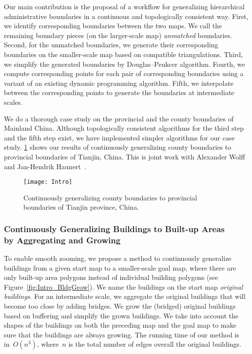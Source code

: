 Our main contribution is the proposal of a workflow for
generalizing hierarchical administrative boundaries in a
continuous and topologically consistent way.  First, we
identify corresponding boundaries between the two maps.
We call the remaining boundary pieces (on the larger-scale map)
\emph{unmatched} boundaries.  
Second, for the unmatched boundaries,
we generate their corresponding boundaries 
on the smaller-scale map
based on compatible triangulations. 
Third, we simplify the generated boundaries
by Douglas--Peukcer algorithm.  
Fourth, we compute corresponding points for each pair
of corresponding boundaries using a variant of an existing 
dynamic programming algorithm.  
Fifth, we interpolate between the corresponding points
to generate the boundaries at intermediate scales.

We do a thorough case study 
on the provincial and the county boundaries of Mainland China.
Although topologically consistent algorithms 
for the third step and the fifth step exist, 
we have implemented simpler algorithms for our case study. 
\fig\ref{fig:Intro_AdminBound_Tianjin} shows our results of 
continuously generalizing county boundaries 
to provincial boundaries of Tianjin, China.
This is joint work with Alexander Wolff 
and Jan-Hendrik Haunert~\parencite[see][]{Peng2016Admin}.

\begin{figure}[tb]
\centering
\texttt{[image: Intro]}
\caption{Continuously generalizing county boundaries to 
provincial boundaries of Tianjin province, China.}
\label{fig:Intro_AdminBound_Tianjin}
\end{figure}

\subsubsection{%
Continuously Generalizing Buildings to Built-up Areas\\
by Aggregating and Growing}

To enable smooth zooming, 
we propose a method to continuously generalize buildings 
from a given start map to a smaller-scale goal map, 
where there are only built-up area polygons 
instead of individual building polygons
(see Figure~\ref{fig:Intro_BldgGrow}).
We name the buildings on the start map 
\emph{original buildings}.
%
For an intermediate scale, 
we aggregate the original buildings that will become too close 
by adding bridges.
We grow the (bridged) original buildings based on buffering 
and simplify the grown buildings.
We take into account the shapes of the buildings 
on both the preceding map and the goal map to make sure that 
the buildings are always growing.
The running time of our method is in~$O(n^3)$,
where~$n$ is the total number of edges
overall the original buildings.
%

